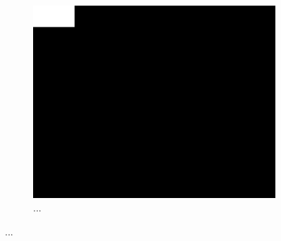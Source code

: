 \begin{figure}
    \begin{subfigure}[c]{0.45\textwidth}
        \centering    \includegraphics[scale=1.0]{resources/SWE_attention/HardAtt/att_S3HT-64P3-T61.jpg}
        \caption{...}
    \end{subfigure}
    \caption{...}
\end{figure}
